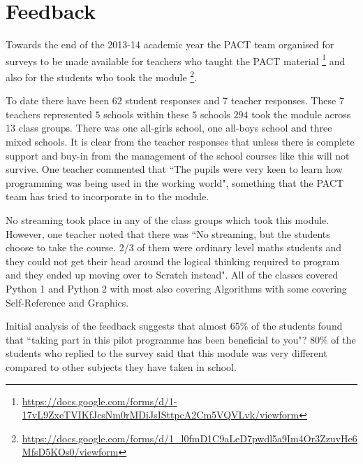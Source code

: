 \documentclass[a4paper]{article}
\begin{document}

\section{Feedback} \label{label:Feedback}
Towards the end of the 2013-14 academic year the PACT team organised for surveys to be made available for teachers who taught the PACT material \footnote{\url{https://docs.google.com/forms/d/1-17vL9ZxeTVIKfJcsNm0rMDiJsISttpcA2Cm5VQVLvk/viewform}} and also for the students who took the module \footnote{\url{https://docs.google.com/forms/d/1_l0fmD1C9aLeD7pwdl5a9Im4Or3ZzuvHe6MfsD5KOs0/viewform}}. 

To date there have been $62$ student responses and $7$ teacher responses.  These $7$ teachers represented $5$ schools within these $5$ schools $294$ took the module across $13$ class groups. There was one all-girls school, one all-boys school and three mixed schools. It is clear from the teacher responses that unless there is complete support and buy-in from the management of the school courses like this will not survive.  One teacher commented that ``The pupils were very keen to learn how programming was being used in the working world", something that the PACT team has tried to incorporate in to the module.

No streaming took place in any of the class groups which took this module. However, one teacher noted that there was ``No streaming, but the students choose to take the course. 2/3 of them were ordinary level maths students and they could not get their head around the logical thinking required to program and they ended up moving over to Scratch instead". All of the classes covered Python 1 and Python 2 with most also covering Algorithms with some covering Self-Reference and Graphics.

Initial analysis of the feedback suggests that almost $65\%$ of the students found that ``taking part in this pilot programme has been beneficial to you"? $80\%$ of the students who replied to the survey said that this module was very different compared to other subjects they have taken in school.
\end{document}
